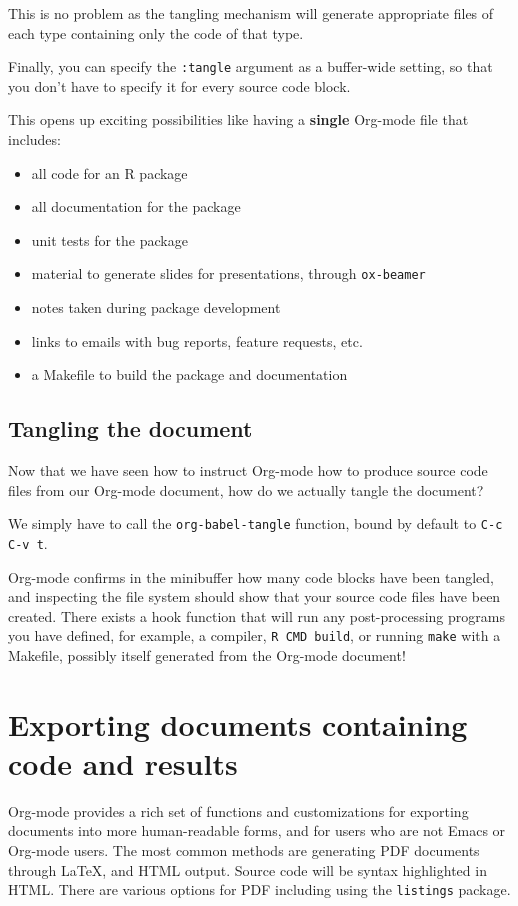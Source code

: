 \documentclass[11pt]{article}
\begin{document}
This is no problem as the tangling mechanism will generate appropriate
files of each type containing only the code of that type.

Finally, you can specify the \texttt{:tangle} argument as a buffer-wide
setting, so that you don't have to specify it for every source code
block.

This opens up exciting possibilities like having a \textbf{single} Org-mode
file that includes:
\begin{itemize}
\item all code for an R package
\item all documentation for the package
\item unit tests for the package
\item material to generate slides for presentations, through \texttt{ox-beamer}
\item notes taken during package development
\item links to emails with bug reports, feature requests, etc.
\item a Makefile to build the package and documentation
\end{itemize}
\subsection*{Tangling the document}
\label{sec-8-2}

Now that we have seen how to instruct Org-mode how to produce source
code files from our Org-mode document, how do we actually tangle the
document?

We simply have to call the \texttt{org-babel-tangle} function, bound by
default to \texttt{C-c C-v t}.

Org-mode confirms in the minibuffer how many code blocks have been
tangled, and inspecting the file system should show that your source
code files have been created. There exists a hook function that will
run any post-processing programs you have defined, for example, a
compiler, \texttt{R CMD build}, or running \texttt{make} with a Makefile, possibly
itself generated from the Org-mode document!
\section*{Exporting documents containing code and results}
\label{sec-9}

Org-mode provides a rich set of functions and customizations for
exporting documents into more human-readable forms, and for users who
are not Emacs or Org-mode users. The most common methods are
generating PDF documents through \LaTeX{}, and HTML output. Source code
will be syntax highlighted in HTML.  There are various options for
PDF including using the \texttt{listings} package.
\end{document}
